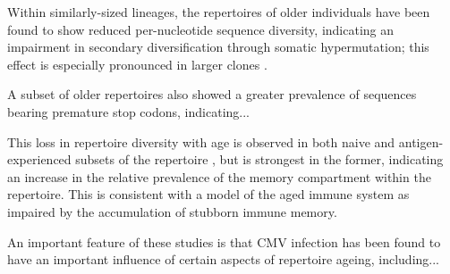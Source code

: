 Within similarly-sized lineages, the repertoires of older individuals have been found to show reduced per-nucleotide sequence diversity, indicating an impairment in secondary diversification through somatic hypermutation; this effect is especially pronounced in larger clones \citep{debourcy2017ageing}. %

A subset of older repertoires also showed a greater prevalence of sequences bearing premature stop codons, indicating... %

This loss in repertoire diversity with age is observed in both naive and antigen-experienced subsets of the repertoire \citep{debourcy2017ageing}, but is strongest in the former, indicating an increase in the relative prevalence of the memory compartment within the repertoire. This is consistent with a model of the aged immune system as impaired by the accumulation of stubborn immune memory.

An important feature of these studies is that CMV infection has been found to have an important influence of certain aspects of repertoire ageing, including...

